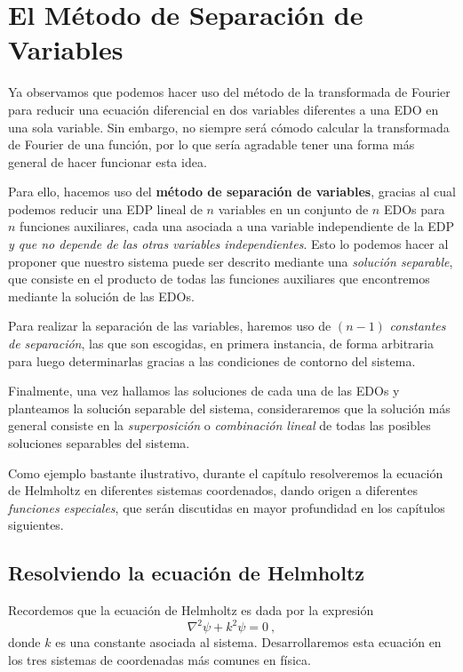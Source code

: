 \chapter{El Método de Separación de Variables} \label{chap:MSV}

Ya observamos que podemos hacer uso del método de la transformada de Fourier para reducir una ecuación diferencial en dos variables diferentes a una EDO en una sola variable. Sin embargo, no siempre será cómodo calcular la transformada de Fourier de una función, por lo que sería agradable tener una forma más general de hacer funcionar esta idea.

Para ello, hacemos uso del \textbf{método de separación de variables}, gracias al cual podemos reducir una EDP lineal de $n$ variables en un conjunto de $n$ EDOs para $n$ funciones auxiliares, cada una asociada a una variable independiente de la EDP \emph{y que no depende de las otras variables independientes}. Esto lo podemos hacer al proponer que nuestro sistema puede ser descrito mediante una \emph{solución separable}, que consiste en el producto de todas las funciones auxiliares que encontremos mediante la solución de las EDOs.

Para realizar la separación de las variables, haremos uso de $(n-1)$ \emph{constantes de separación}, las que son escogidas, en primera instancia, de forma arbitraria para luego determinarlas gracias a las condiciones de contorno del sistema.

Finalmente, una vez hallamos las soluciones de cada una de las EDOs y planteamos la solución separable del sistema, consideraremos que la solución más general consiste en la \emph{superposición} o \emph{combinación lineal} de todas las posibles soluciones separables del sistema.

Como ejemplo bastante ilustrativo, durante el capítulo resolveremos la ecuación de Helm\-holtz en diferentes sistemas coordenados, dando origen a diferentes \emph{funciones especiales}, que serán discutidas en mayor profundidad en los capítulos siguientes.

\section{Resolviendo la ecuación de Helmholtz}

Recordemos que la ecuación de Helmholtz es dada por la expresión
\begin{equation}\label{eq:Helmholtz}
    \nabla^2 \psi + k^2 \psi = 0 \ ,
\end{equation}
donde $k$ es una constante asociada al sistema. Desarrollaremos esta ecuación en los tres sistemas de coordenadas más comunes en física.

